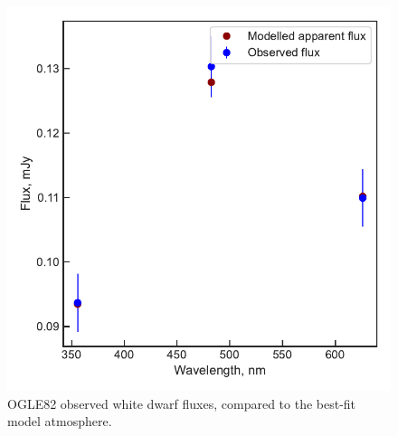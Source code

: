 \begin{figure}
    \centering
    \includegraphics[width=\textwidth]{figures/results/OGLE82/fluxplot.pdf}
    \caption{OGLE82 observed white dwarf fluxes, compared to the best-fit model atmosphere.}
    \label{fig:OGLE82 flux plot}
\end{figure}
\clearpage


